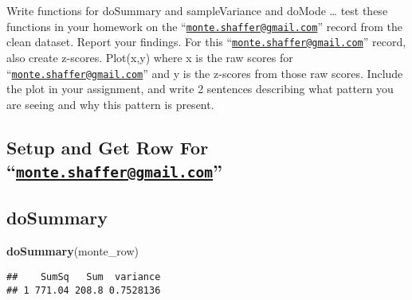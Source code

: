 \documentclass[
]{article}
\newenvironment{Shaded}{\begin{snugshade}}{\end{snugshade}}
\newcommand{\DataTypeTok}[1]{\textcolor[rgb]{0.13,0.29,0.53}{#1}}
\newcommand{\KeywordTok}[1]{\textcolor[rgb]{0.13,0.29,0.53}{\textbf{#1}}}
\newcommand{\NormalTok}[1]{#1}
\newcommand{\OperatorTok}[1]{\textcolor[rgb]{0.81,0.36,0.00}{\textbf{#1}}}
\newcommand{\StringTok}[1]{\textcolor[rgb]{0.31,0.60,0.02}{#1}}
\begin{document}
\begin{Shaded}
\begin{Highlighting}[]
Write functions for doSummary and sampleVariance and doMode \ldots{}
test these functions in your homework on the
``\href{mailto:monte.shaffer@gmail.com}{\nolinkurl{monte.shaffer@gmail.com}}''
record from the clean dataset. Report your findings. For this
``\href{mailto:monte.shaffer@gmail.com}{\nolinkurl{monte.shaffer@gmail.com}}''
record, also create z-scores. Plot(x,y) where x is the raw scores for
``\href{mailto:monte.shaffer@gmail.com}{\nolinkurl{monte.shaffer@gmail.com}}''
and y is the z-scores from those raw scores. Include the plot in your
assignment, and write 2 sentences describing what pattern you are seeing
and why this pattern is present.

\hypertarget{setup-and-get-row-for-monte.shaffergmail.com}{%
\subsection{\texorpdfstring{Setup and Get Row For
``\href{mailto:monte.shaffer@gmail.com}{\nolinkurl{monte.shaffer@gmail.com}}''}{Setup and Get Row For ``monte.shaffer@gmail.com''}}\label{setup-and-get-row-for-monte.shaffergmail.com}}

\begin{Shaded}
\end{Shaded}

\hypertarget{dosummary}{%
\subsection{doSummary}\label{dosummary}}

\begin{Shaded}
\begin{Highlighting}[]
\KeywordTok{doSummary}\NormalTok{(monte_row)}
\end{Highlighting}
\end{Shaded}

\begin{verbatim}
##    SumSq   Sum  variance
## 1 771.04 208.8 0.7528136
\end{verbatim}


\end{Highlighting}
\end{Shaded}
\end{document}
